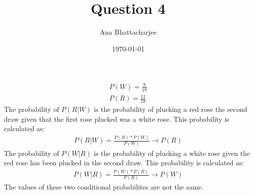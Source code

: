 \documentclass{article}
\begin{document}
\title{Question 4}
\author{Ana Bhattacharjee}
\date{\today}
\maketitle

\begin{center}

  \begin{align}
    P(W) = \frac{8}{19} \\
    P(R) = \frac{11}{18}
  \end{align}
  The probability of $P(R | W)$ is the probability of plucking a red rose the second draw given that the first rose plucked was a white rose. This probability is calculated as:
  \begin{align}
    P(R | W) = \frac{P(R) * P(W)}{P(W)} \rightarrow P(R)
  \end{align}
  The probability of $P(W | R)$ is the probability of plucking a white rose given the red rose has been plucked in the second draw. This probability is calculated as:
  \begin{align}
    P(W | R) = \frac{P(W) * P(R)}{P(R)} \rightarrow P(W)
  \end{align}
  The values of these two conditional probabilites are not the same. 
\end{center}
\end{document}
